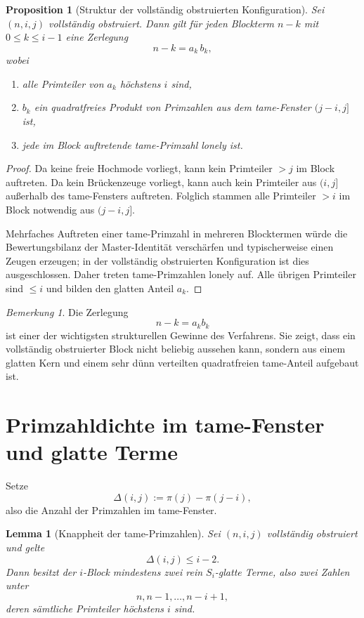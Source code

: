 \documentclass[12pt,a4paper]{article}
\theoremstyle{plain}
\newtheorem{lemma}{Lemma}
\newtheorem{proposition}{Proposition}
\theoremstyle{definition}
\theoremstyle{remark}
\newtheorem{bemerkung}{Bemerkung}
\begin{document}
	\begin{proposition}[Struktur der vollständig obstruierten Konfiguration]\label{prop:structure}
		Sei $(n,i,j)$ vollständig obstruiert. Dann gilt für jeden Blockterm $n-k$ mit $0\le k\le i-1$ eine Zerlegung
		\[
		n-k=a_k\,b_k,
		\]
		wobei
		\begin{enumerate}[label=(\roman*)]
			\item alle Primteiler von $a_k$ höchstens $i$ sind,
			\item $b_k$ ein quadratfreies Produkt von Primzahlen aus dem tame-Fenster $(j-i,j]$ ist,
			\item jede im Block auftretende tame-Primzahl lonely ist.
		\end{enumerate}
	\end{proposition}
	
	\begin{proof}
		Da keine freie Hochmode vorliegt, kann kein Primteiler $>j$ im Block auftreten. 
		Da kein Brückenzeuge vorliegt, kann auch kein Primteiler aus $(i,j]$ außerhalb des tame-Fensters auftreten. 
		Folglich stammen alle Primteiler $>i$ im Block notwendig aus $(j-i,j]$.
		
		Mehrfaches Auftreten einer tame-Primzahl in mehreren Blocktermen würde die Bewertungsbilanz der Master-Identität verschärfen und typischerweise einen Zeugen erzeugen; in der vollständig obstruierten Konfiguration ist dies ausgeschlossen. 
		Daher treten tame-Primzahlen lonely auf. 
		Alle übrigen Primteiler sind $\le i$ und bilden den glatten Anteil $a_k$.
	\end{proof}
	
	\begin{bemerkung}
		Die Zerlegung
		\[
		n-k=a_k b_k
		\]
		ist einer der wichtigsten strukturellen Gewinne des Verfahrens. 
		Sie zeigt, dass ein vollständig obstruierter Block nicht beliebig aussehen kann, sondern aus einem glatten Kern und einem sehr dünn verteilten quadratfreien tame-Anteil aufgebaut ist.
	\end{bemerkung}
	
	\section{Primzahldichte im tame-Fenster und glatte Terme}
	
	Setze
	\[
	\Delta(i,j):=\pi(j)-\pi(j-i),
	\]
	also die Anzahl der Primzahlen im tame-Fenster.
	
	\begin{lemma}[Knappheit der tame-Primzahlen]\label{lem:smoothterms}
		Sei $(n,i,j)$ vollständig obstruiert und gelte
		\[
		\Delta(i,j)\le i-2.
		\]
		Dann besitzt der $i$-Block mindestens zwei rein $S_i$-glatte Terme, also zwei Zahlen unter
		\[
		n,n-1,\dots,n-i+1,
		\]
		deren sämtliche Primteiler höchstens $i$ sind.
	\end{lemma}
	
\end{document}
